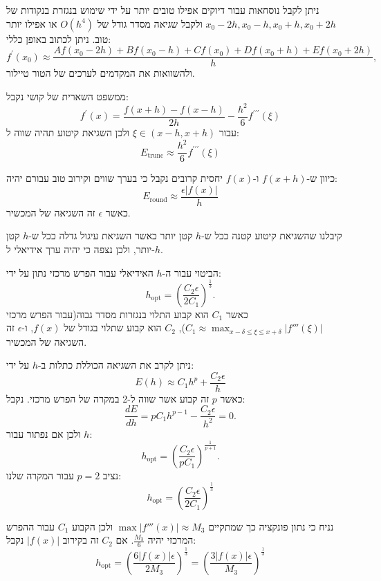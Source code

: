 \documentclass{tstextbook}
\begin{document}
\begin{remark}
ניתן לקבל נוסחאות עבור דיוקים אפילו טובים יותר על ידי שימוש בנגזרת בנקודות של \(x_{0}-2h,x_{0}-h,x_{0}+h,x_{0}+2h\) ולקבל שגיאה מסדר גודל של \(O(h^{4})\) או אפילו יותר טוב. ניתן לכתוב באופן כללי:
$$f^{\prime}(x_{0})\approx{\frac{A f(x_{0}-2h)+B f(x_{0}-h)+C f(x_{0})+D f(x_{0}+h)+E f(x_{0}+2h)}{h}},$$
ולהשוואות את המקדמים לערכים של הטור טיילור.

\end{remark}
\begin{corollary}
ממשפט השארית של קושי נקבל:
$$f^{\prime}(x)=\frac{f(x+h)-f(x-h)}{2h}-\frac{h^{2}}{6}f^{\prime\prime\prime}(\xi)$$
עבור \(\xi \in (x-h,x+h)\) ולכן השגיאת קיטוע תהיה שווה ל:
$$E_{\mathrm{trunc}}\approx{\frac{h^{2}}{6}}f^{\prime\prime\prime}(\xi)$$

\end{corollary}
\begin{proposition}
כיוון ש-\(f(x+h)\) ו-\(f(x)\) יחסית קרובים נקבל כי בערך שווים וקירוב טוב עבורם יהיה:
$$E_{\mathrm{round}}\approx{\frac{\epsilon\left|f(x)\right|}{h}}$$
כאשר \(\epsilon\) זה השגיאה של המכשיר.

\end{proposition}
\begin{remark}
קיבלנו שהשגיאת קיטוע קטנה ככל ש-\(h\) קטן יותר כאשר השגיאת עיגול גדלה ככל ש-\(h\) קטן יותר, ולכן נצפה כי יהיה ערך אידיאלי ל-\(h\).

\end{remark}
\begin{proposition}
הביטוי עבור ה-\(h\) האידיאלי עבור הפרש מרכזי נתון על ידי:
$$h_{\mathrm{opt}}=\left({\frac{C_{2}\epsilon}{2C_{1}}}\right)^{\frac{1}{3}}.$$
כאשר \(C_{1}\) הוא קבוע התלוי בנגזרות מסדר גבוה(עבור הפרש מרכזי \(C_{1}\approx \max_{x-\delta \leq \xi \leq x+\delta}\lvert f'''(\xi) \rvert\)), \(C_{2}\) הוא קבוע שתלוי בגודל של \(f(x)\), ו-\(\epsilon\) זה השגיאה של המכשיר.

\end{proposition}
\begin{proposition}
ניתן לקרב את השגיאה הכוללת כתלות ב-\(h\) על ידי:
$$E(h)\approx C_{1}h^{p}+\frac{C_{2}\epsilon}{h}$$
כאשר \(p\) זה קבוע אשר שווה ל-2 במקרה של הפרש מרכזי. נקבל:
$${\frac{d E}{d h}}=p C_{1}h^{p-1}-{\frac{C_{2}\epsilon}{h^{2}}}=0.$$
ולכן אם נפתור עבור \(h\):
$$h_{\mathrm{opt}}=\left({\frac{C_{2}\epsilon}{p C_{1}}}\right)^{\frac{1}{p+1}}.$$
נציב \(p=2\) עבור המקרה שלנו:
$$h_{\mathrm{opt}}=\left({\frac{C_{2}\epsilon}{2C_{1}}}\right)^{\frac{1}{3}}$$

\end{proposition}
\begin{example}
נניח כי נתון פונקציה כך שמתקיים \(\max\lvert f'''(x) \rvert\approx M_{3}\) ולכן הקבוע \(C_{1}\) עבור ההפרש המרכזי יהיה \(\frac{M_{3}}{6}\). אם \(C_{2}\) זה בקירוב \(\lvert f(x) \rvert\) נקבל:
$$h_{\mathrm{opt}}=\left({\frac{6|f(x)|\epsilon}{2M_{3}}}\right)^{\frac{1}{3}}=\left({\frac{3|f(x)|\epsilon}{M_{3}}}\right)^{\frac{1}{3}}$$

\end{example}
\end{document}
